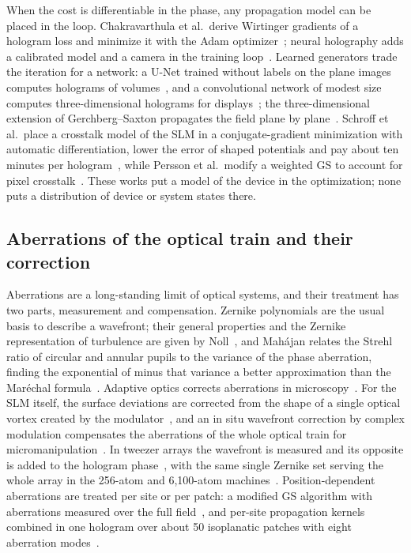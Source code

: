 When the cost is differentiable in the phase, any propagation model can be placed in the loop. Chakravarthula et al.\ derive Wirtinger gradients of a hologram loss and minimize it with the Adam optimizer~\cite{chakravarthula2019};
neural holography adds a calibrated model and a camera in the training loop~\cite{peng2020}. Learned generators trade the iteration for a network: a U-Net trained without labels on the plane images computes holograms of volumes~\cite{eybposh2020},
and a convolutional network of modest size computes three-dimensional holograms for displays~\cite{shi2021}; the three-dimensional extension of Gerchberg--Saxton propagates the field plane by plane~\cite{whyte2005}.
Schroff et al.\ place a crosstalk model of the SLM in a conjugate-gradient minimization with automatic differentiation, lower the error of shaped potentials and pay about ten minutes per hologram~\cite{schroff2023}, while Persson et al.\ modify a weighted
GS to account for pixel crosstalk~\cite{persson2012}. These works put a model of the device in the optimization; none puts a distribution of device or system states there.

\subsection{Aberrations of the optical train and their correction}

Aberrations are a long-standing limit of optical systems, and their treatment has two parts, measurement and compensation. Zernike polynomials are the usual basis to describe a wavefront; their general properties and the Zernike representation of
turbulence are given by Noll~\cite{noll1976}, and Mah\'ajan relates the Strehl ratio of circular and annular pupils to the variance of the phase aberration, finding the exponential of minus that variance a better approximation than the Mar\'echal formula~\cite{mahajan1983}.
Adaptive optics corrects aberrations in microscopy~\cite{booth2007}. For the SLM itself, the surface deviations are corrected from the shape of a single optical vortex created by the modulator~\cite{jesacher2007}, and an in situ wavefront
correction by complex modulation compensates the aberrations of the whole optical train for micromanipulation~\cite{cizmar2010}. In tweezer arrays the wavefront is measured and its opposite is added to the hologram phase~\cite{nogrette2014}, with
the same single Zernike set serving the whole array in the 256-atom and 6,100-atom machines~\cite{ebadi2021,manetsch2025}. Position-dependent aberrations are treated per site or per patch: a modified GS algorithm with aberrations measured over the full field~\cite{machu2025}, and per-site propagation
kernels combined in one hologram over about 50 isoplanatic patches with eight aberration modes~\cite{christen2025}.

